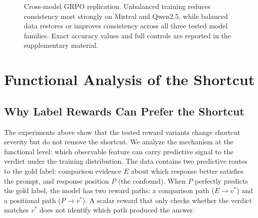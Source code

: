 \documentclass[letterpaper]{article}
\begin{document}
\begin{figure}[H]
\centering
{}
\caption{Cross-model GRPO replication. Unbalanced training reduces consistency most strongly on Mistral and Qwen2.5, while balanced data restores or improves consistency across all three tested model families. Exact accuracy values and full controls are reported in the supplementary material.}
\label{fig:crossmodel-main}
\end{figure}

\section{Functional Analysis of the Shortcut}

\subsection{Why Label Rewards Can Prefer the Shortcut}

The experiments above show that the tested reward variants change shortcut severity but do not remove the shortcut. We analyze the mechanism at the functional level: which observable feature can carry predictive signal to the verdict under the training distribution. The data contains two predictive routes to the gold label: comparison evidence $E$ about which response better satisfies the prompt, and response position $P$ (the confound). When $P$ perfectly predicts the gold label, the model has two reward paths: a comparison path ($E \to v^*$) and a positional path ($P \to v^*$). A scalar reward that only checks whether the verdict matches $v^*$ does not identify which path produced the answer.
\end{document}
